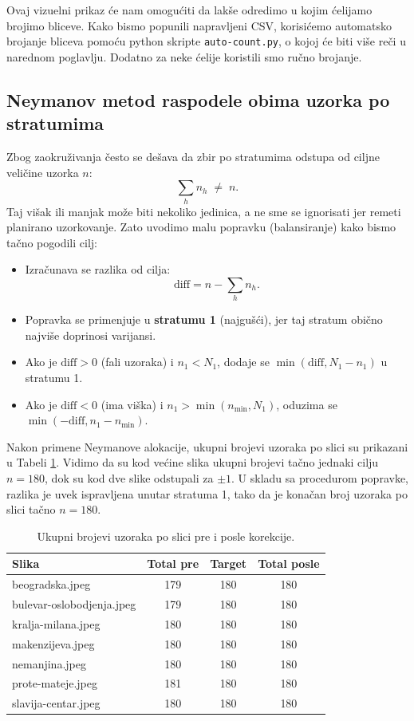 \documentclass[a4paper,12pt]{article}
\begin{document}
\noindent
Ovaj vizuelni prikaz će nam omogućiti da lakše odredimo u kojim ćelijamo brojimo bliceve. 
Kako bismo popunili napravljeni CSV, korisićemo automatsko brojanje bliceva pomoću python skripte \texttt{auto-count.py}, o kojoj će biti više
reči u narednom poglavlju. Dodatno za neke ćelije koristili smo ručno brojanje.

\subsection{Neymanov metod raspodele obima uzorka po stratumima}
\noindent
Zbog zaokruživanja često se dešava da zbir po stratumima odstupa od ciljne veličine uzorka $n$:
\[
\sum_h n_h \;\neq\; n.
\]
Taj višak ili manjak može biti nekoliko jedinica, a ne sme se ignorisati jer remeti planirano uzorkovanje.
Zato uvodimo malu popravku (balansiranje) kako bismo tačno pogodili cilj:
\begin{itemize}
  \item Izračunava se razlika od cilja:
  \[
  \text{diff} = n - \sum_h n_h.
  \]
  \item Popravka se primenjuje u \textbf{stratumu 1} (najgušći), jer taj stratum obično najviše doprinosi varijansi. 
  \item Ako je $\text{diff} > 0$ (fali uzoraka) i $n_1 < N_1$, dodaje se $\min(\text{diff}, N_1 - n_1)$ u stratumu 1.
  \item Ako je $\text{diff} < 0$ (ima viška) i $n_1 > \min(n_{\min}, N_1)$, oduzima se $\min(-\text{diff}, n_1 - n_{\min})$.
\end{itemize}

\noindent
Nakon primene Neymanove alokacije, ukupni brojevi uzoraka po slici su prikazani u Tabeli \ref{tab:alloc-fix-real}.  
Vidimo da su kod većine slika ukupni brojevi tačno jednaki cilju $n=180$, dok su kod dve slike odstupali za $\pm 1$.  
U skladu sa procedurom popravke, razlika je uvek ispravljena unutar stratuma 1, tako da je konačan broj uzoraka po slici tačno $n=180$.

\begin{table}[H]
\centering
\begin{tabular}{lccc}
\hline
Slika & Total pre & Target & Total posle \\
\hline
beogradska.jpeg          & 179 & 180 & 180 \\
bulevar-oslobodjenja.jpeg & 179 & 180 & 180 \\
kralja-milana.jpeg       & 180 & 180 & 180 \\
makenzijeva.jpeg         & 180 & 180 & 180 \\
nemanjina.jpeg           & 180 & 180 & 180 \\
prote-mateje.jpeg        & 181 & 180 & 180 \\
slavija-centar.jpeg      & 180 & 180 & 180 \\
\hline
\end{tabular}
\caption{Ukupni brojevi uzoraka po slici pre i posle korekcije.}
\label{tab:alloc-fix-real}
\end{table}
\end{document}
